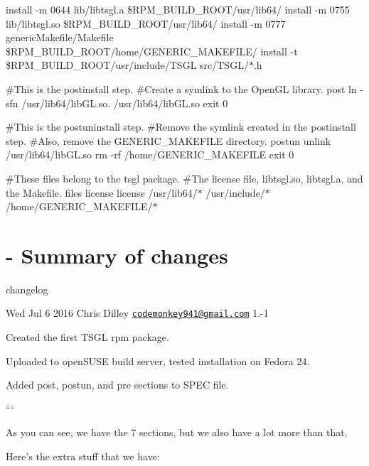 install -\/m 0644 lib/libtsgl.\-a \$\-R\-P\-M\-\_\-\-B\-U\-I\-L\-D\-\_\-\-R\-O\-O\-T/usr/lib64/ install -\/m 0755 lib/libtsgl.\-so \$\-R\-P\-M\-\_\-\-B\-U\-I\-L\-D\-\_\-\-R\-O\-O\-T/usr/lib64/ install -\/m 0777 generic\-Makefile/\-Makefile \$\-R\-P\-M\-\_\-\-B\-U\-I\-L\-D\-\_\-\-R\-O\-O\-T/home/\-G\-E\-N\-E\-R\-I\-C\-\_\-\-M\-A\-K\-E\-F\-I\-L\-E/ install -\/t \$\-R\-P\-M\-\_\-\-B\-U\-I\-L\-D\-\_\-\-R\-O\-O\-T/usr/include/\-T\-S\-G\-L src/\-T\-S\-G\-L/$\ast$.h

\#\-This is the postinstall step. \#\-Create a symlink to the Open\-G\-L library. post ln -\/sfn /usr/lib64/lib\-G\-L.so. /usr/lib64/lib\-G\-L.so exit 0

\#\-This is the postuninstall step. \#\-Remove the symlink created in the postinstall step. \#\-Also, remove the G\-E\-N\-E\-R\-I\-C\-\_\-\-M\-A\-K\-E\-F\-I\-L\-E directory. postun unlink /usr/lib64/lib\-G\-L.so rm -\/rf /home/\-G\-E\-N\-E\-R\-I\-C\-\_\-\-M\-A\-K\-E\-F\-I\-L\-E exit 0

\#\-These files belong to the tsgl package. \#\-The license file, libtsgl.\-so, libtsgl.\-a, and the Makefile. files license license /usr/lib64/$\ast$ /usr/include/$\ast$ /home/\-G\-E\-N\-E\-R\-I\-C\-\_\-\-M\-A\-K\-E\-F\-I\-L\-E/$\ast$

\section*{-\/ Summary of changes}

changelog
\begin{DoxyItemize}
\item Wed Jul 6 2016 Chris Dilley \href{mailto:codemonkey941@gmail.com}{\tt codemonkey941@gmail.\-com} 1.-\/1
\item Created the first T\-S\-G\-L rpm package.
\item Uploaded to open\-S\-U\-S\-E build server, tested installation on Fedora 24.
\item Added post, postun, and pre sections to S\-P\-E\-C file.
\end{DoxyItemize}

```

As you can see, we have the 7 sections, but we also have a lot more than that.

Here's the extra stuff that we have\-:


